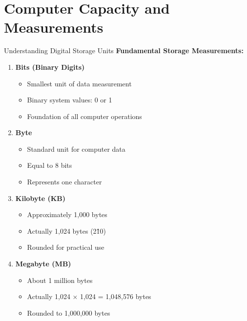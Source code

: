 \documentclass[aspectratio=169]{beamer}
\begin{document}
\section{Computer Capacity and Measurements}

\begin{frame}{Understanding Digital Storage Units}
    \textbf{Fundamental Storage Measurements:}
    
    \begin{enumerate}
        \item \textbf{Bits (Binary Digits)}
        \begin{itemize}
            \item Smallest unit of data measurement
            \item Binary system values: 0 or 1
            \item Foundation of all computer operations
        \end{itemize}
        
        \item \textbf{Byte}
        \begin{itemize}
            \item Standard unit for computer data
            \item Equal to 8 bits
            \item Represents one character
        \end{itemize}
        
        \item \textbf{Kilobyte (KB)}
        \begin{itemize}
            \item Approximately 1,000 bytes
            \item Actually 1,024 bytes (2\^{10})
            \item Rounded for practical use
        \end{itemize}
        
        \item \textbf{Megabyte (MB)}
        \begin{itemize}
            \item About 1 million bytes
            \item Actually 1,024 × 1,024 = 1,048,576 bytes
            \item Rounded to 1,000,000 bytes
        \end{itemize}
    \end{enumerate}
\end{frame}
\end{document}
